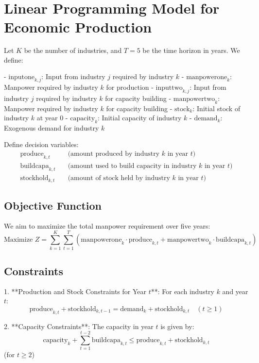 \documentclass{article}
\begin{document}
\section*{Linear Programming Model for Economic Production}

Let \( K \) be the number of industries, and \( T = 5 \) be the time horizon in years. We define:

- \( \text{inputone}_{k,j} \): Input from industry \( j \) required by industry \( k \)
- \( \text{manpowerone}_{k} \): Manpower required by industry \( k \) for production
- \( \text{inputtwo}_{k,j} \): Input from industry \( j \) required by industry \( k \) for capacity building
- \( \text{manpowertwo}_{k} \): Manpower required by industry \( k \) for capacity building
- \( \text{stock}_{k} \): Initial stock of industry \( k \) at year 0
- \( \text{capacity}_{k} \): Initial capacity of industry \( k \)
- \( \text{demand}_{k} \): Exogenous demand for industry \( k \)

Define decision variables:
\[
\begin{align*}
\text{produce}_{k,t} & \quad \text{(amount produced by industry } k \text{ in year } t\text{)} \\
\text{buildcapa}_{k,t} & \quad \text{(amount used to build capacity in industry } k \text{ in year } t\text{)} \\
\text{stockhold}_{k,t} & \quad \text{(amount of stock held by industry } k \text{ in year } t\text{)}
\end{align*}
\]

\subsection*{Objective Function}
We aim to maximize the total manpower requirement over five years:
\[
\text{Maximize } Z = \sum_{k=1}^{K} \sum_{t=1}^{T} \left( \text{manpowerone}_{k} \cdot \text{produce}_{k,t} + \text{manpowertwo}_{k} \cdot \text{buildcapa}_{k,t} \right)
\]

\subsection*{Constraints}

1. **Production and Stock Constraints for Year \( t \)**:
   For each industry \( k \) and year \( t \):
   \[
   \text{produce}_{k,t} + \text{stockhold}_{k,t-1} = \text{demand}_{k} + \text{stockhold}_{k,t} \quad (t \geq 1)
   \]

2. **Capacity Constraints**:
   The capacity in year \( t \) is given by:
   \[
   \text{capacity}_{k} + \sum_{t=1}^{t-2} \text{buildcapa}_{k,t} \leq \text{produce}_{k,t} + \text{stockhold}_{k,t}
   \]
   (for \( t \geq 2 \))
\end{document}
